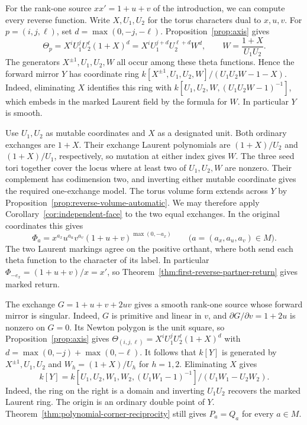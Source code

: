 \documentclass[11pt,reqno]{amsart}
\numberwithin{equation}{section}
\theoremstyle{definition}
\theoremstyle{remark}
\begin{document}
For the rank-one source \(xx'=1+u+v\) of the introduction, we can
compute every reverse function. Write \(X,U_1,U_2\) for the torus
characters dual to \(x,u,v\). For \(p=(i,j,\ell)\), set
\(d=\max(0,-j,-\ell)\). Proposition~\ref{prop:axis} gives
\[ \Theta_p=X^i U_1^j U_2^\ell(1+X)^d =X^i U_1^{j+d}U_2^{\ell+d}W^d,\qquad W=\frac{1+X}{U_1U_2}. \]
The generators \(X^{\pm1},U_1,U_2,W\) all occur among these theta
functions. Hence the forward mirror \(Y\) has coordinate ring
\(k[X^{\pm1},U_1,U_2,W]/(U_1U_2W-1-X)\). Indeed, eliminating \(X\)
identifies this ring with \(k[U_1,U_2,W,(U_1U_2W-1)^{-1}]\), which
embeds in the marked Laurent field by the formula for \(W\).
In particular \(Y\) is smooth.

Use \(U_1,U_2\) as mutable coordinates and \(X\) as a designated unit.
Both ordinary exchanges are \(1+X\). Their exchange Laurent polynomials
are \((1+X)/U_2\) and \((1+X)/U_1\), respectively, so mutation at
either index gives \(W\). The three seed tori together cover the locus
where at least two of \(U_1,U_2,W\) are nonzero. Their complement has
codimension two, and inverting either mutable coordinate gives the
required one-exchange model. The torus volume form extends across \(Y\)
by Proposition~\ref{prop:reverse-volume-automatic}. We may therefore
apply Corollary~\ref{cor:independent-face} to the two equal exchanges.
In the original coordinates this gives
\[ \Phi_a=x^{a_x}u^{a_u}v^{a_v}(1+u+v)^{\max(0,-a_x)} \qquad\bigl(a=(a_x,a_u,a_v)\in M\bigr). \]
The two Laurent markings agree on the positive orthant, where both
send each theta function to the character of its label. In particular
\(\Phi_{-e_x}=(1+u+v)/x=x'\), so
Theorem~\ref{thm:first-reverse-partner-return} gives marked return.

The exchange \(G=1+u+v+2uv\) gives a smooth rank-one source whose
forward mirror is singular. Indeed, \(G\) is primitive and linear in
\(v\), and \(\partial G/\partial v=1+2u\) is nonzero on \(G=0\).
Its Newton polygon is the unit square, so Proposition~\ref{prop:axis}
gives \(\Theta_{(i,j,\ell)}=X^iU_1^jU_2^\ell(1+X)^d\) with
\(d=\max(0,-j)+\max(0,-\ell)\).
It follows that \(k[Y]\) is generated by \(X^{\pm1},U_1,U_2\) and
\(W_h=(1+X)/U_h\) for \(h=1,2\). Eliminating \(X\) gives
\[ k[Y]=k[U_1,U_2,W_1,W_2,(U_1W_1-1)^{-1}]/(U_1W_1-U_2W_2). \]
Indeed, the ring on the right is a domain and inverting \(U_1U_2\)
recovers the marked Laurent ring. The origin is an ordinary double
point of \(Y\). Theorem~\ref{thm:polynomial-corner-reciprocity}
still gives \(P_a=Q_a\) for every \(a\in M\).
\end{document}
